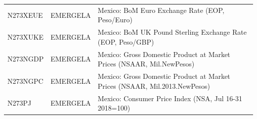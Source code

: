 \documentclass[
]{book}
\begin{document}
\begin{longtable}[]{@{}lll@{}}
\begin{minipage}[t]{0.20\columnwidth}
N273XEUE\strut
\end{minipage} & \begin{minipage}[t]{0.30\columnwidth}\raggedright
EMERGELA\strut
\end{minipage} & \begin{minipage}[t]{0.41\columnwidth}\raggedright
Mexico: BoM Euro Exchange Rate (EOP, Peso/Euro)\strut
\end{minipage}\tabularnewline
\begin{minipage}[t]{0.20\columnwidth}\raggedright
N273XUKE\strut
\end{minipage} & \begin{minipage}[t]{0.30\columnwidth}\raggedright
EMERGELA\strut
\end{minipage} & \begin{minipage}[t]{0.41\columnwidth}\raggedright
Mexico: BoM UK Pound Sterling Exchange Rate (EOP, Peso/GBP)\strut
\end{minipage}\tabularnewline
\begin{minipage}[t]{0.20\columnwidth}\raggedright
N273NGDP\strut
\end{minipage} & \begin{minipage}[t]{0.30\columnwidth}\raggedright
EMERGELA\strut
\end{minipage} & \begin{minipage}[t]{0.41\columnwidth}\raggedright
Mexico: Gross Domestic Product at Market Prices (NSAAR, Mil.NewPesos)\strut
\end{minipage}\tabularnewline
\begin{minipage}[t]{0.20\columnwidth}\raggedright
N273NGPC\strut
\end{minipage} & \begin{minipage}[t]{0.30\columnwidth}\raggedright
EMERGELA\strut
\end{minipage} & \begin{minipage}[t]{0.41\columnwidth}\raggedright
Mexico: Gross Domestic Product at Market Prices (NSAAR, Mil.2013.NewPesos)\strut
\end{minipage}\tabularnewline
\begin{minipage}[t]{0.20\columnwidth}\raggedright
N273PJ\strut
\end{minipage} & \begin{minipage}[t]{0.30\columnwidth}\raggedright
EMERGELA\strut
\end{minipage} & \begin{minipage}[t]{0.41\columnwidth}\raggedright
Mexico: Consumer Price Index (NSA, Jul 16-31 2018=100)\strut
\end{minipage}\tabularnewline

\end{longtable}
\end{document}
